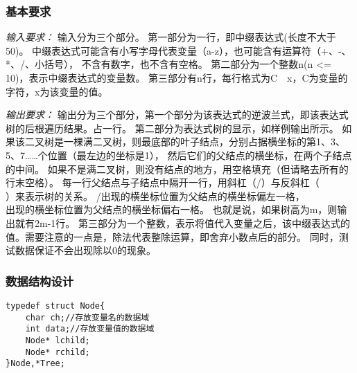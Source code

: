 \documentclass[a4paper,11pt]{article}%
\newenvironment{shadedquotation}
 {\begin{shaded*}
  \quoting[leftmargin=0pt, vskip=0pt]
 }
 {\endquoting
 \end{shaded*}
}
\begin{document}
\subsubsection{基本要求}
\begin{shadedquotation}
    \emph{输入要求：}
    输入分为三个部分。
    第一部分为一行，即中缀表达式(长度不大于50)。
    中缀表达式可能含有小写字母代表变量（a-z），也可能含有运算符（+、-、*、/、小括号），
    不含有数字，也不含有空格。
    第二部分为一个整数n(n <= 10)，表示中缀表达式的变量数。
    第三部分有n行，每行格式为C　x，C为变量的字符，x为该变量的值。
\end{shadedquotation}
\begin{shadedquotation}
    \emph{输出要求：}
    输出分为三个部分，第一个部分为该表达式的逆波兰式，即该表达式树的后根遍历结果。占一行。
第二部分为表达式树的显示，如样例输出所示。
如果该二叉树是一棵满二叉树，则最底部的叶子结点，分别占据横坐标的第1、3、5、7……个位置（最左边的坐标是1），
然后它们的父结点的横坐标，在两个子结点的中间。
如果不是满二叉树，则没有结点的地方，用空格填充（但请略去所有的行末空格）。
每一行父结点与子结点中隔开一行，用斜杠（/）与反斜杠（\\）来表示树的关系。
/出现的横坐标位置为父结点的横坐标偏左一格，\\出现的横坐标位置为父结点的横坐标偏右一格。
也就是说，如果树高为m，则输出就有2m-1行。
第三部分为一个整数，表示将值代入变量之后，该中缀表达式的值。需要注意的一点是，除法代表整除运算，即舍弃小数点后的部分。
同时，测试数据保证不会出现除以0的现象。
\end{shadedquotation}
\subsubsection{数据结构设计}
\begin{lstlisting}[language={[ANSI]C},keywordstyle=\color{blue!70},commentstyle=\color{red!50!green!50!blue!50},frame=shadowbox,
				rulesepcolor=\color{red!20!green!20!blue!20}]
typedef struct Node{
    char ch;//存放变量名的数据域
    int data;//存放变量值的数据域
    Node* lchild;
    Node* rchild;
}Node,*Tree;
\end{lstlisting}
\end{document}
